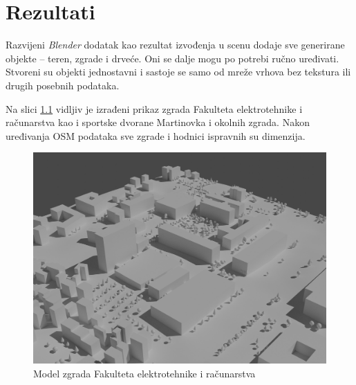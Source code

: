 \documentclass[times, utf8, zavrsni, numeric]{fer}
\begin{document}
\chapter{Rezultati}
	
	Razvijeni \textit{Blender} dodatak kao rezultat izvođenja u scenu dodaje sve generirane objekte -- teren, zgrade i drveće.
	Oni se dalje mogu po potrebi ručno uređivati.
	Stvoreni su objekti jednostavni i sastoje se samo od mreže vrhova bez tekstura ili drugih posebnih podataka.
	
	Na slici \ref{fig:fer_basic_render} vidljiv je izrađeni prikaz  zgrada Fakulteta elektrotehnike i računarstva kao i sportske dvorane Martinovka i okolnih zgrada.
	Nakon uređivanja OSM podataka sve zgrade i hodnici ispravnih su dimenzija.
	
	\begin{figure}[H]
		\includegraphics[width=\linewidth]{figures/fer_basic_render.jpg}
		\centering
		\caption{Model zgrada Fakulteta elektrotehnike i računarstva}
		\label{fig:fer_basic_render}
	\end{figure}
	
\end{document}
